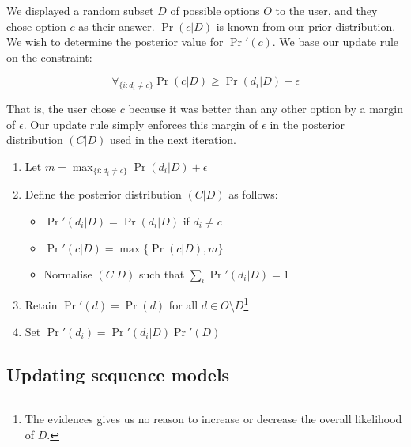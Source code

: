 \documentclass[11pt,a4paper]{article}
\begin{document}
We displayed a random subset $D$ of possible options $O$ to the user, and they
chose option $c$ as their answer. $\Pr(c|D)$ is known from our prior
distribution. We wish to determine the posterior value for $\Pr'(c)$.
We base our update rule on the constraint:

\[
\forall_{\{i:d_i \ne c\}} \Pr(c|D) \ge \Pr(d_i|D) + \epsilon
\]

That is, the user chose $c$ because it was better than any other option by a
margin of $\epsilon$. Our update rule simply enforces this margin of
$\epsilon$ in the posterior distribution $(C|D)$ used in the next iteration.

\begin{enumerate}
  \item Let $m = \max_{\{i: d_i \ne c\}} \Pr(d_i|D) + \epsilon$
  \item Define the posterior distribution $(C|D)$ as follows:
  \begin{itemize}
    \item $\Pr'(d_i|D) = \Pr(d_i|D)$ if $d_i \ne c$
    \item $\Pr'(c|D) = \max\{\Pr(c|D), m\}$
    \item Normalise $(C|D)$ such that $\sum_i \Pr'(d_i|D) = 1$
  \end{itemize}
  \item Retain $\Pr'(d) = \Pr(d)$ for all $d \in O \setminus D$\footnote{The evidences gives us no reason to
    increase or decrease the overall likelihood of $D$.}
  \item Set $\Pr'(d_i) = \Pr'(d_i|D)\Pr'(D)$
\end{enumerate}

\subsection{Updating sequence models}
\end{document}
